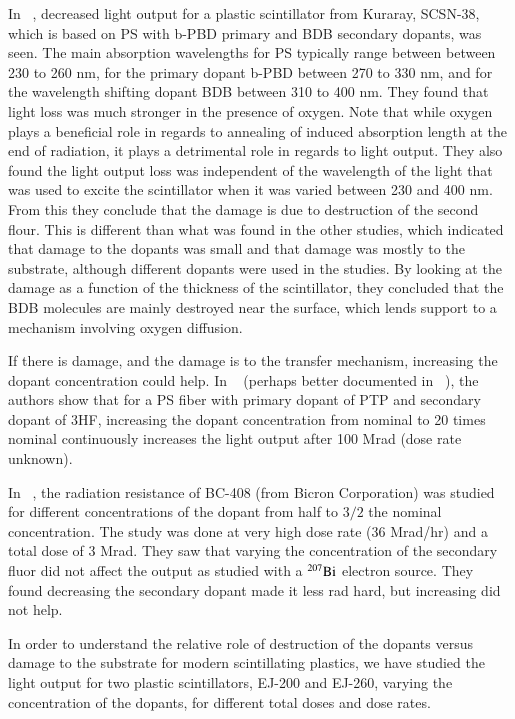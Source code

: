 \documentclass[review]{elsarticle}
\begin{document}
In ~\cite{Wick1991472}, decreased light
output for a plastic scintillator from Kuraray, SCSN-38, which
is based on PS with b-PBD primary and BDB secondary dopants, was seen.
The main absorption wavelengths for PS typically range between
between 230 to 260 nm, for the primary dopant b-PBD between 270 to 330 nm,
and for the wavelength shifting dopant BDB between 310 to 400 nm.
They found that light loss was much stronger in the presence of oxygen.
Note that while oxygen plays a beneficial role in regards
to annealing of induced absorption length at the end of radiation, 
it plays a detrimental role in 
regards to light output.  
They also found the light output loss
was independent of the wavelength of the light
that was used to excite the scintillator when it
was varied between 230 and 400 nm.
From this they conclude that the damage is due to destruction
of the second flour.  This is different than what was found in
the other studies, which indicated that damage to the dopants was
small and that damage was mostly to the substrate,
although different dopants were used in the studies.
By looking at the damage as a function of the thickness of the scintillator,
they concluded that the BDB molecules are mainly destroyed
near the surface, which lends support to a mechanism involving
oxygen diffusion.


If there is damage, and the damage is to the transfer mechanism, increasing the dopant
concentration could help.
In ~\cite{zorn3} (perhaps better documented in ~\cite{sauli}), the authors show that for a PS fiber with primary dopant of PTP and secondary dopant of 3HF,
increasing the dopant concentration from nominal to 20 times nominal continuously increases the light output after 100 Mrad (dose rate unknown).

In ~\cite{Majewski1989500}, the radiation resistance of BC-408 (from Bicron Corporation) was studied for different concentrations of the dopant from half to $3/2$ the nominal concentration.  The study was done at very high dose rate (36 Mrad/hr) and a total dose of 3 Mrad.  They saw that varying the concentration of the secondary fluor did not affect the output as studied with a $\rm{^{207}Bi}$ electron source.  They found decreasing the secondary dopant made it less rad hard, but increasing did not help.  



In order to understand the relative role of destruction of the dopants versus damage to the substrate for modern scintillating plastics,
we have studied the light output for two plastic scintillators, EJ-200 and EJ-260, varying the concentration of the dopants, for
different total doses and dose rates.  
\end{document}

